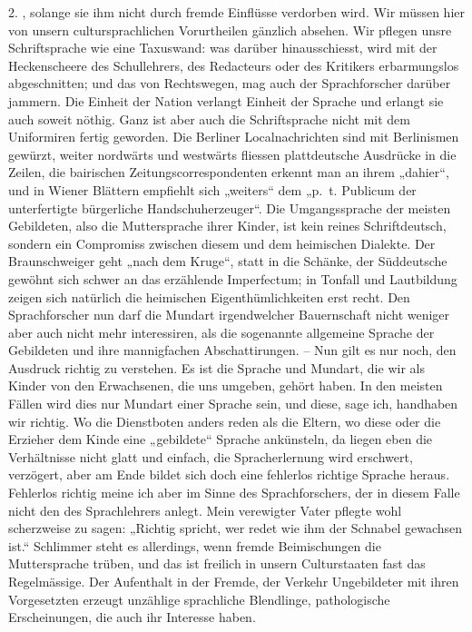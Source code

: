 \label{II.III.handhabung} 2.  \label{fp.62}, solange sie ihm nicht durch fremde Einflüsse verdorben wird. Wir müssen hier von unsern cultursprachlichen Vorurtheilen gänzlich absehen. Wir pflegen unsre Schriftsprache wie eine Taxuswand: was darüber hinausschiesst, wird mit der Heckenscheere des Schullehrers, des Redacteurs oder des Kritikers erbarmungslos abgeschnitten; und das von Rechtswegen, mag auch der Sprachforscher darüber jammern. Die Einheit der Nation verlangt Einheit der Sprache und erlangt sie auch soweit nöthig. Ganz ist aber auch die Schriftsprache nicht mit dem Uniformiren fertig geworden. Die Berliner Localnachrichten sind mit Berlinismen gewürzt, weiter nordwärts und westwärts fliessen plattdeutsche Ausdrücke in die Zeilen, die bairischen Zeitungscorrespondenten erkennt man an ihrem „dahier“, und in Wiener Blättern empfiehlt sich „weiters“ dem „p.~t. Publicum der unterfertigte bürgerliche Handschuherzeuger“. Die Umgangssprache der meisten Gebildeten, also die Muttersprache ihrer Kinder, ist kein reines Schriftdeutsch, sondern ein Compromiss zwischen diesem und dem heimischen Dialekte. Der Braunschweiger geht „nach dem Kruge“, statt in die Schänke, der Süddeutsche gewöhnt sich schwer an das erzählende Imperfectum; in Tonfall und Lautbildung zeigen sich natürlich die heimischen Eigenthümlichkeiten erst recht. Den Sprachforscher nun darf die Mundart irgendwelcher Bauernschaft nicht weniger aber auch nicht mehr interessiren, als die sogenannte allgemeine Sprache der Gebildeten und ihre mannigfachen Abschattirungen. – Nun gilt es nur noch, den Ausdruck  richtig zu verstehen. Es ist die Sprache und Mundart, die wir als Kinder von den Erwachsenen, die uns umgeben, gehört haben. In den meisten Fällen wird dies nur  Mundart einer Sprache sein, und diese, sage ich, handhaben wir richtig. Wo die Dienstboten anders reden als die Eltern, wo diese oder die Erzieher dem Kinde eine „gebildete“ Sprache ankünsteln, da liegen eben die Verhältnisse nicht glatt und einfach, die Spracherlernung wird erschwert, verzögert, aber am Ende bildet sich doch eine fehlerlos richtige Sprache heraus. Fehlerlos richtig meine ich aber im Sinne des Sprachforschers, der in diesem Falle nicht den  des Sprachlehrers anlegt. Mein verewigter Vater pflegte wohl scherzweise zu sagen: „Richtig spricht, wer redet wie ihm der Schnabel gewachsen ist.“ Schlimmer steht es allerdings, wenn fremde Beimischungen die Muttersprache trüben, und das ist freilich in unsern Culturstaaten fast das Regelmässige. Der \label{fp.63} Aufenthalt in der Fremde, der Verkehr Ungebildeter mit ihren Vorgesetzten erzeugt unzählige sprachliche Blendlinge, pathologische Erscheinungen, die auch ihr Interesse haben.

